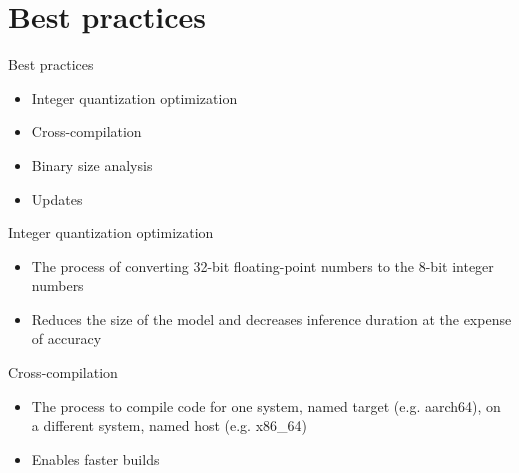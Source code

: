 
\section{Best practices}

\begin{frame}{Best practices}
  \begin{itemize}
	\item Integer quantization optimization
	\item Cross-compilation
	\item Binary size analysis
	\item Updates
  \end{itemize}
\end{frame}

\begin{frame}{Integer quantization optimization}
  \begin{itemize}
	\item The process of converting 32-bit floating-point numbers to the 8-bit integer numbers
	\item Reduces the size of the model and decreases inference duration at the expense of accuracy
  \end{itemize}
\end{frame}

\begin{frame}{Cross-compilation}
  \begin{itemize}
	\item The process to compile code for one system, named target (e.g.
	aarch64), on a different system, named host (e.g. x86\_64)
	\item Enables faster builds
  \end{itemize}
\end{frame}


